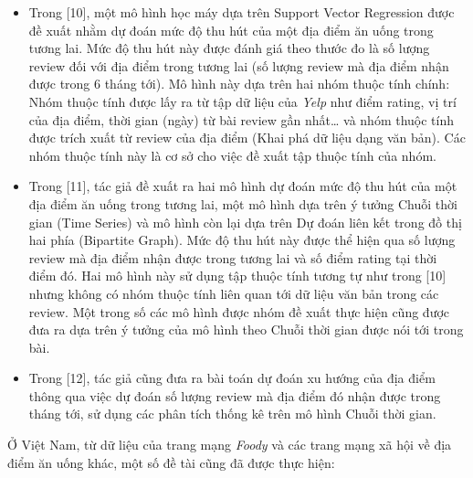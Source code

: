 \documentclass[12pt]{extarticle}
\begin{document}
\begin{itemize}
				\item Trong [10], một mô hình học máy dựa trên Support Vector Regression được đề xuất nhằm dự đoán mức độ thu hút của một địa điểm ăn uống trong tương lai. Mức độ thu hút này được đánh giá theo thước đo là số lượng review đối với địa điểm trong tương lai (số lượng review mà địa điểm nhận được trong 6 tháng tới). Mô hình này dựa trên hai nhóm thuộc tính chính: Nhóm thuộc tính được lấy ra từ tập dữ liệu của \textit{Yelp} như điểm rating, vị trí của địa điểm, thời gian (ngày) từ bài review gần nhất… và nhóm thuộc tính được trích xuất từ review của địa điểm (Khai phá dữ liệu dạng văn bản). Các nhóm thuộc tính này là cơ sở cho việc đề xuất tập thuộc tính của nhóm.
				\item Trong [11], tác giả đề xuất ra hai mô hình dự đoán mức độ thu hút của một địa điểm ăn uống trong tương lai, một mô hình dựa trên ý tưởng Chuỗi thời gian (Time Series) và mô hình còn lại dựa trên Dự đoán liên kết trong đồ thị hai phía (Bipartite Graph). Mức độ thu hút này được thể hiện qua số lượng review mà địa điểm nhận được trong tương lai và số điểm rating tại thời điểm đó. Hai mô hình này sử dụng tập thuộc tính tương tự như trong [10] nhưng không có nhóm thuộc tính liên quan tới dữ liệu văn bản trong các review. Một trong số các mô hình được nhóm đề xuất thực hiện cũng được đưa ra dựa trên ý tưởng của mô hình theo Chuỗi thời gian được nói tới trong bài. 
				\item Trong [12], tác giả cũng đưa ra bài toán dự đoán xu hướng của địa điểm thông qua việc dự đoán số lượng review mà địa điểm đó nhận được trong tháng tới, sử dụng các phân tích thống kê trên mô hình Chuỗi thời gian.
			\end{itemize}
			\par Ở Việt Nam, từ dữ liệu của trang mạng \textit{Foody}  và các trang mạng xã hội về địa điểm ăn uống khác, một số đề tài cũng đã được thực hiện:
\end{document}
